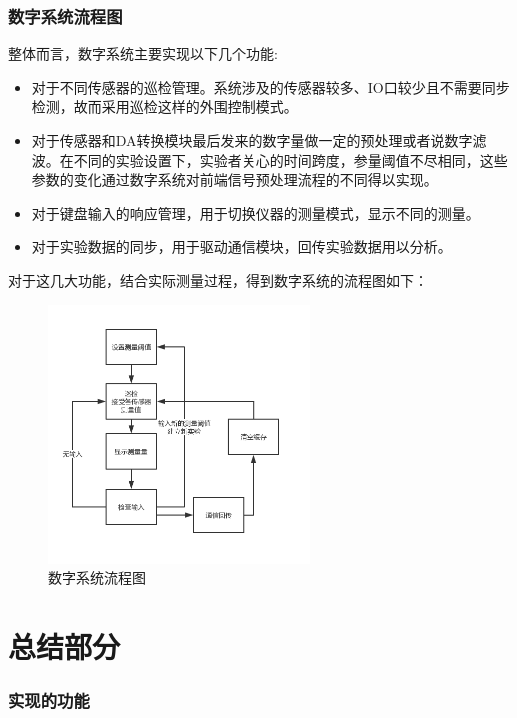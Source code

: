\documentclass[a4paper, 11pt]{article} %
\begin{document}
\section{数字系统流程图}

整体而言，数字系统主要实现以下几个功能:

\begin{itemize}
    \item 对于不同传感器的巡检管理。系统涉及的传感器较多、IO口较少且不需要同步检测，故而采用巡检这样的外围控制模式。
    \item 对于传感器和DA转换模块最后发来的数字量做一定的预处理或者说数字滤波。在不同的实验设置下，实验者关心的时间跨度，参量阈值不尽相同，这些参数的变化通过数字系统对前端信号预处理流程的不同得以实现。
    \item 对于键盘输入的响应管理，用于切换仪器的测量模式，显示不同的测量。
    \item 对于实验数据的同步，用于驱动通信模块，回传实验数据用以分析。
\end{itemize}

对于这几大功能，结合实际测量过程，得到数字系统的流程图如下：

\begin{figure}[H]
    \centering
    \includegraphics[width = 0.618\textwidth]{digital_flow.png}
    \caption{数字系统流程图}
\end{figure}

\newpage
\part{总结部分}
\section{实现的功能}
\end{document}
